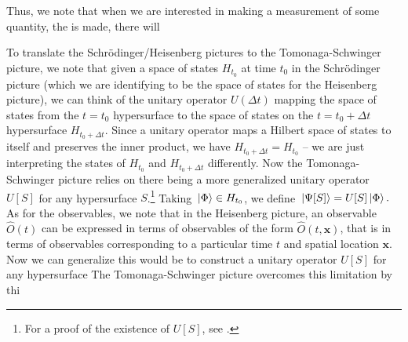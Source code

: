 Thus, we note that when we are interested in making a measurement of some quantity, the  is made, there will

To translate the Schr\"{o}dinger/Heisenberg pictures to the Tomonaga-Schwinger picture, we note that given a space of states $H_{t_0}$ at time $t_0$ in the  Schr\"{o}dinger picture (which we are identifying to be the space of states for the Heisenberg picture), we can think of the unitary operator $U(\Delta t)$ mapping the space of states from the $t=t_0$ hypersurface to the space of states on the $t=t_0+\Delta t$ hypersurface $H_{t_0+\Delta t}$. Since a unitary operator maps a Hilbert space of states to itself and preserves the inner product, we have $H_{t_0+\Delta t}=H_{t_0}$ -- we are just interpreting the states of $H_{t_0}$ and $H_{t_0+\Delta t}$ differently. Now the Tomonaga-Schwinger picture relies on there being a more generalized unitary operator $U[S]$ for any hypersurface $S$.\footnote{For a proof of the existence of $U[S]$, see \cite[p. 1445]{SchwingerJulianI}.}  Taking $\ket*{\Phi}\in H_{t_0}$, we define $\ket*{\Psi[S]}=U[S]\ket*{\Phi}.$ As for the observables, we note that in the Heisenberg picture, an observable $\hat{O}(t)$ can be expressed in terms of observables of the form $\hat{O}(t, \bm{x})$, that is in terms of observables corresponding to a particular time $t$ and spatial location $\bm{x}$. 
Now we can generalize this would be to construct a unitary operator $U[S]$ for any hypersurface 
The Tomonaga-Schwinger picture overcomes this limitation by thi

